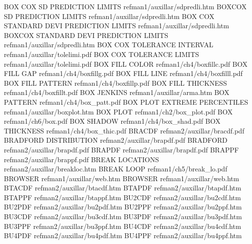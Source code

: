BOX COX SD PREDICTION LIMITS            refman1/auxillar/sdpredli.htm
BOXCOX SD PREDICTION LIMITS             refman1/auxillar/sdpredli.htm
BOX COX STANDARD DEVI PREDICTION LIMITS refman1/auxillar/sdpredli.htm
BOXCOX STANDARD DEVI PREDICTION LIMITS  refman1/auxillar/sdpredli.htm
BOX COX TOLERANCE INTERVAL              refman1/auxillar/tolelimi.pdf
BOX COX TOLERANCE LIMITS                refman1/auxillar/tolelimi.pdf
BOX FILL COLOR                          refman1/ch4/boxfillc.pdf
BOX FILL GAP                            refman1/ch4/boxfillg.pdf
BOX FILL LINE                           refman1/ch4/boxfilll.pdf
BOX FILL PATTERN                        refman1/ch4/boxfillp.pdf
BOX FILL THICKNESS                      refman1/ch4/boxfillt.pdf
BOX JENKINS                             refman1/auxillar/arma.htm
BOX PATTERN                             refman1/ch4/box_patt.pdf
BOX PLOT EXTREME PERCENTILES            refman1/auxillar/boxplot.htm
BOX PLOT                                refman1/ch2/box_plot.pdf
BOX                                     refman1/ch6/box.pdf
BOX SHADOW                              refman1/ch4/box_shad.pdf
BOX THICKNESS                           refman1/ch4/box_thic.pdf
BRACDF                                  refman2/auxillar/bracdf.pdf
BRADFORD DISTRIBUTION                   refman2/auxillar/brapdf.pdf
BRADFORD                                refman2/auxillar/brapdf.pdf
BRAPDF                                  refman2/auxillar/brapdf.pdf
BRAPPF                                  refman2/auxillar/brappf.pdf
BREAK LOCATIONS                         refman2/auxillar/breakloc.htm
BREAK LOOP                              refman1/ch5/break_lo.pdf
BROWSER                                 refman1/auxillar/web.htm
BROWSER                                 refman1/auxillar/web.htm
BTACDF                                  refman2/auxillar/btacdf.htm
BTAPDF                                  refman2/auxillar/btapdf.htm
BTAPPF                                  refman2/auxillar/btappf.htm
BU2CDF                                  refman2/auxillar/bu2cdf.htm
BU2PDF                                  refman2/auxillar/bu2pdf.htm
BU2PPF                                  refman2/auxillar/bu2ppf.htm
BU3CDF                                  refman2/auxillar/bu3cdf.htm
BU3PDF                                  refman2/auxillar/bu3pdf.htm
BU3PPF                                  refman2/auxillar/bu3ppf.htm
BU4CDF                                  refman2/auxillar/bu4cdf.htm
BU4PDF                                  refman2/auxillar/bu4pdf.htm
BU4PPF                                  refman2/auxillar/bu4ppf.htm
